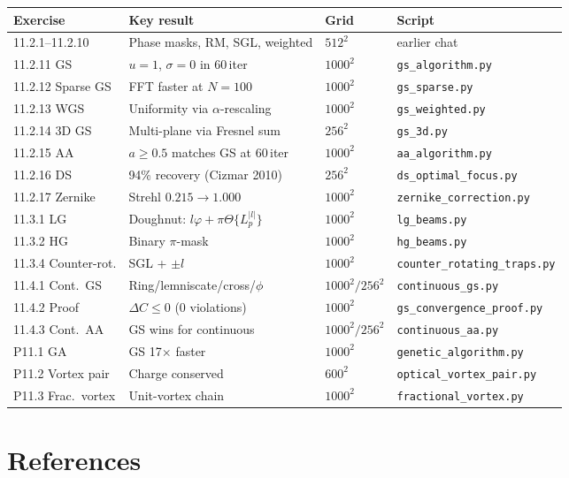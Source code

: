 \documentclass[11pt,a4paper]{article}
\begin{document}
\begin{center}
\small
\begin{tabular}{p{3.2cm}p{5.2cm}p{2.2cm}p{3cm}}
\toprule
Exercise & Key result & Grid & Script \\
\midrule
11.2.1--11.2.10 & Phase masks, RM, SGL, weighted & $512^2$ & earlier chat \\
11.2.11 GS & $u=1$, $\sigma=0$ in 60\,iter & $1000^2$ & \texttt{gs\_algorithm.py} \\
11.2.12 Sparse GS & FFT faster at $N=100$ & $1000^2$ & \texttt{gs\_sparse.py} \\
11.2.13 WGS & Uniformity via $\alpha$-rescaling & $1000^2$ & \texttt{gs\_weighted.py} \\
11.2.14 3D GS & Multi-plane via Fresnel sum & $256^2$ & \texttt{gs\_3d.py} \\
11.2.15 AA & $a\!\geq\!0.5$ matches GS at 60\,iter & $1000^2$ & \texttt{aa\_algorithm.py} \\
11.2.16 DS & 94\% recovery (Cizmar 2010) & $256^2$ & \texttt{ds\_optimal\_focus.py} \\
11.2.17 Zernike & Strehl $0.215\!\to\!1.000$ & $1000^2$ & \texttt{zernike\_correction.py} \\
11.3.1 LG & Doughnut: $l\varphi+\pi\Theta\{L_p^{|l|}\}$ & $1000^2$ & \texttt{lg\_beams.py} \\
11.3.2 HG & Binary $\pi$-mask & $1000^2$ & \texttt{hg\_beams.py} \\
11.3.4 Counter-rot. & SGL + $\pm l$ & $1000^2$ & \texttt{counter\_rotating\_traps.py} \\
11.4.1 Cont.\ GS & Ring/lemniscate/cross/$\phi$ & $1000^2/256^2$ & \texttt{continuous\_gs.py} \\
11.4.2 Proof & $\Delta C\leq0$ (0 violations) & $1000^2$ & \texttt{gs\_convergence\_proof.py} \\
11.4.3 Cont.\ AA & GS wins for continuous & $1000^2/256^2$ & \texttt{continuous\_aa.py} \\
P11.1 GA & GS 17$\times$ faster & $1000^2$ & \texttt{genetic\_algorithm.py} \\
P11.2 Vortex pair & Charge conserved & $600^2$ & \texttt{optical\_vortex\_pair.py} \\
P11.3 Frac.\ vortex & Unit-vortex chain & $1000^2$ & \texttt{fractional\_vortex.py} \\
\bottomrule
\end{tabular}
\end{center}

\section*{References}
\end{document}
